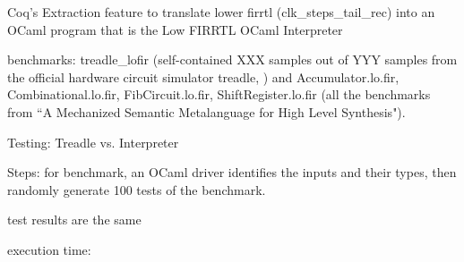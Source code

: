 Coq's Extraction feature to translate lower firrtl (clk\_steps\_tail\_rec) into an OCaml program that is the Low FIRRTL OCaml Interpreter

benchmarks: treadle\_lofir (self-contained XXX samples out of YYY samples from the official hardware circuit simulator \textsf{treadle}, )
and Accumulator.lo.fir, Combinational.lo.fir, FibCircuit.lo.fir, ShiftRegister.lo.fir (all the benchmarks from ``A Mechanized Semantic Metalanguage for
High Level Synthesis").


Testing:  Treadle vs. Interpreter

Steps: for benchmark, an OCaml driver identifies the inputs and their types, then
randomly generate 100 tests of the benchmark.

test results are the same

execution time: 